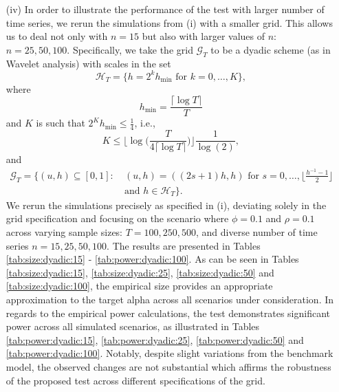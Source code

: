 \documentclass[a4paper,12pt]{article}
\begin{document}
\begin{enumerate}[label=\arabic*.,leftmargin=0.6cm]
{\begin{itemize}[topsep=0pt]
\item[(iv)] In order to illustrate the performance of the test with larger number of time series, we rerun the simulations from (i) with a smaller grid. This allows us to deal not only with $n=15$ but also with larger values of $n$: $n=25, 50, 100$. Specifically, we take the grid $\mathcal{G}_T$ to be a dyadic scheme (as in Wavelet analysis) with scales in the set 
\[ \mathcal{H}_T = \big\{ h = 2^k h_{\min} \text{ for } k=0,\ldots,K \big\}, \]  
where 
\[ h_{\min} = \frac{\lceil \log T \rceil}{T} \]
and $K$ is such that $2^K h_{\min} \le \frac{1}{4}$, i.e.,
\[ K \le \Big\lfloor \log\Big(\frac{T}{4 \lceil \log T \rceil }\Big) \Big\rfloor \frac{1}{\log(2)}, \]
and 
\begin{align*}
\mathcal{G}_T = \big\{ (u,h) \subseteq [0,1]: & \ (u,h) = ((2s+1) h, h) \text{ for } s = 0,\ldots,\Big\lfloor \frac{h^ {-1}-1}{2} \Big\rfloor \\ & \ \text{and } h \in \mathcal{H}_T \big\}.
\end{align*}
We rerun the simulations precisely as specified in (i), deviating solely in the grid specification and focusing on the scenario where $\phi = 0.1$ and $\rho = 0.1$ across varying sample sizes: $T=100, 250, 500$, and diverse number of time series $n=15, 25, 50, 100$. The results are presented in Tables \ref{tab:size:dyadic:15} - \ref{tab:power:dyadic:100}. As can be seen in Tables \ref{tab:size:dyadic:15}, \ref{tab:size:dyadic:25}, \ref{tab:size:dyadic:50} and \ref{tab:size:dyadic:100}, the empirical size provides an appropriate approximation to the target alpha across all scenarios under consideration. In regards to the empirical power calculations, the test demonstrates significant power across all simulated scenarios, as illustrated in Tables \ref{tab:power:dyadic:15}, \ref{tab:power:dyadic:25}, \ref{tab:power:dyadic:50} and \ref{tab:power:dyadic:100}. Notably, despite slight variations from the benchmark model, the observed changes are not substantial which affirms the robustness of the proposed test across different specifications of the grid.


\end{itemize}}
\end{enumerate}
\end{document}
